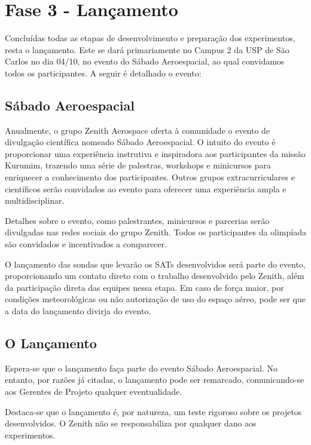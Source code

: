 \section{Fase 3 - Lançamento}\label{sec:lancamento}
    \par Concluídas todas as etapas de desenvolvimento e preparação dos experimentos, 
    resta o lançamento. Este se dará primariamente no Campus 2 da USP de São Carlos no 
    dia 04/10, no evento do Sábado Aeroespacial, ao qual convidamos todos os participantes.
    A seguir é detalhado o evento:    

    \subsection{Sábado Aeroespacial}\label{sec:sabado_aeroespacial}
        Anualmente, o grupo Zenith Aerospace oferta à comunidade o evento de divulgação científica nomeado Sábado Aeroespacial. O intuito do evento é proporcionar uma experiência instrutiva e inspiradora aos participantes da missão Kurumim, trazendo uma série de palestras, workshops e minicursos para enriquecer a conhecimento dos participantes. Outros grupos extracurriculares e científicos serão convidados ao evento para oferecer uma experiência ampla e multidisciplinar.

        Detalhes sobre o evento, como palestrantes, minicursos e parcerias serão divulgadas nas redes sociais do grupo Zenith. Todos os participantes da olimpíada são convidados e incentivados a comparecer.
        
        O lançamento das sondas que levarão os SATs desenvolvidos será parte do evento, proporcionando um contato direto com o trabalho desenvolvido pelo Zenith, além da participação direta das equipes nessa etapa. Em caso de força maior, por condições meteorológicas ou não autorização de uso do espaço aéreo, pode ser que a data do lançamento divirja do evento.

    \subsection{O Lançamento}\label{sec:lançamento}
        Espera-se que o lançamento faça parte do evento Sábado Aeroespacial. No entanto, por razões já citadas, o lançamento pode ser remarcado, comunicando-se aos Gerentes de Projeto qualquer eventualidade.

        Destaca-se que o lançamento é, por natureza, um teste rigoroso sobre os projetos desenvolvidos. O Zenith não se responsabiliza por qualquer dano aos experimentos.